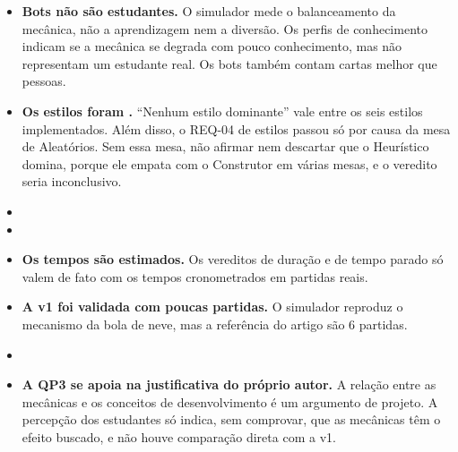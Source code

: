 \begin{itemize}
  \item \textbf{Bots não são estudantes.} O simulador mede o balanceamento da mecânica, não a aprendizagem nem a
    diversão. Os perfis de conhecimento indicam se a mecânica se degrada com pouco conhecimento, mas não
    representam um estudante real. Os bots também contam cartas melhor que pessoas.
  \item \textbf{Os estilos foram .} ``Nenhum estilo dominante'' vale entre os
    seis estilos implementados. Além disso, o REQ-04 de estilos passou só por causa da mesa de Aleatórios. Sem
    essa mesa, não  afirmar nem descartar que o Heurístico domina, porque ele empata com
    o Construtor em várias mesas, e o veredito seria inconclusivo.
  \item {}
  \item {}
  \item \textbf{Os tempos são estimados.} Os vereditos de duração e de tempo parado só valem de fato com os
    tempos cronometrados em partidas reais.
  \item \textbf{A v1 foi validada com poucas partidas.} O simulador reproduz o mecanismo da bola de neve, mas a
    referência do artigo são 6 partidas.
  \item {}
  \item \textbf{A QP3 se apoia na justificativa do próprio autor.} A relação entre as mecânicas e os conceitos
    de desenvolvimento é um argumento de projeto. A percepção dos estudantes só indica, sem comprovar, que as
    mecânicas têm o efeito buscado, e não houve comparação direta com a v1.
\end{itemize}

